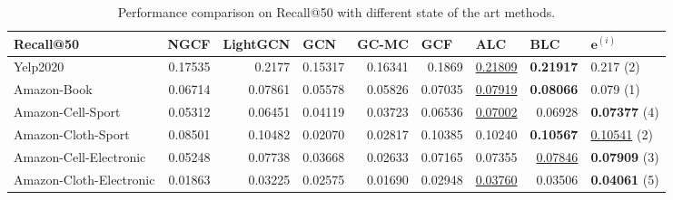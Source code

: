 \begin{table*}[h!]
    \centering
    \begin{tabular}{|l|r|r|r|r|r||r|r|l|}
        \hline
        Recall@50               & \multicolumn{1}{l|}{NGCF} & \multicolumn{1}{l|}{LightGCN} & \multicolumn{1}{l|}{GCN} & \multicolumn{1}{l|}{GC-MC} & \multicolumn{1}{l||}{GCF} & \multicolumn{1}{l|}{ALC} & \multicolumn{1}{l|}{BLC} & $\mathbf{e}^{(i)}$      \\ \hline
        Yelp2020                & 0.17535                   & 0.2177                        & 0.15317                  & 0.16341                    & 0.1869                    & \underline{0.21809}      & \textbf{0.21917}         & 0.217 (2)               \\ \hline
        Amazon-Book             & 0.06714                   & 0.07861                       & 0.05578                  & 0.05826                    & 0.07035                   & \underline{0.07919}      & \textbf{0.08066}         & 0.079 (1)               \\ \hline
        Amazon-Cell-Sport       & 0.05312                   & 0.06451                       & 0.04119                  & 0.03723                    & 0.06536                   & \underline{0.07002}      & 0.06928                  & \textbf{0.07377} (4)    \\ \hline
        Amazon-Cloth-Sport      & 0.08501                   & 0.10482                       & 0.02070                  & 0.02817                    & 0.10385                   & 0.10240                  & \textbf{0.10567}         & \underline{0.10541} (2) \\ \hline
        Amazon-Cell-Electronic  & 0.05248                   & 0.07738                       & 0.03668                  & 0.02633                    & 0.07165                   & 0.07355                  & \underline{0.07846}      & \textbf{0.07909} (3)    \\ \hline
        Amazon-Cloth-Electronic & 0.01863                   & 0.03225                       & 0.02575                  & 0.01690                    & 0.02948                   & \underline{0.03760}      & 0.03506                  & \textbf{0.04061} (5)    \\ \hline
    \end{tabular}
    \caption{Performance comparison on Recall@50 with different state of the art methods.}
    \label{tab:baselines-recall}
\end{table*}